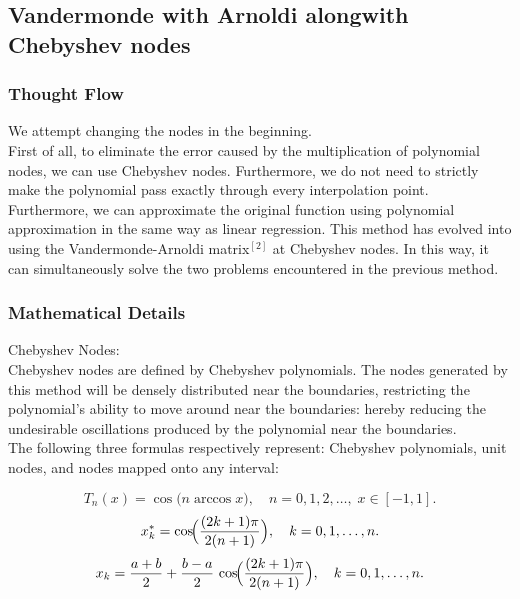 \documentclass[11pt]{article}
\begin{document}
\subsection{Vandermonde with Arnoldi alongwith Chebyshev nodes}
\subsubsection{Thought Flow}
We attempt changing the nodes in the beginning.\\
First of all, to eliminate the error caused by the multiplication of polynomial nodes, we can use Chebyshev nodes. Furthermore, we do not need 
to strictly make the polynomial pass exactly through every interpolation point. \\
Furthermore, we can approximate the original function using polynomial 
approximation in the same way as linear regression. This method has evolved into using the Vandermonde-Arnoldi matrix$^{[2]}$ at 
Chebyshev nodes. In this way, it can simultaneously solve the two problems encountered in the previous method.

\subsubsection{Mathematical Details}
Chebyshev Nodes:\\
Chebyshev nodes are defined by Chebyshev polynomials. 
The nodes generated by this method will be densely distributed near the boundaries, restricting the polynomial's 
ability to move around near the boundaries: hereby reducing the undesirable oscillations produced by the polynomial 
near the boundaries.\\
The following three formulas respectively represent: Chebyshev polynomials, unit nodes, and nodes mapped onto any interval:

  \begin{equation}
    T_{n}(x)=\cos\!\bigl(n\arccos x\bigr),\quad n=0,1,2,\dots,\;x\in[-1,1].
  \end{equation}
  \begin{equation}
    x_k^{*}
    =\cos\!\Bigl(\frac{(2k+1)\pi}{2(n+1)}\Bigr),\quad k=0,1,\dots,n.
  \end{equation}
  \begin{equation}
    x_k
    =\frac{a+b}{2}
     +\frac{b-a}{2}\,
      \cos\!\Bigl(\frac{(2k+1)\pi}{2(n+1)}\Bigr),
    \quad k=0,1,\dots,n.
  \end{equation}
\end{document}
